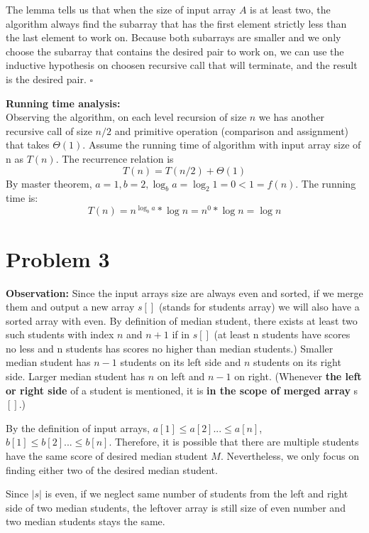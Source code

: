 \documentclass{article}
\begin{document}
The lemma tells us that when the size of input array $A$ is at least two, the algorithm always find the subarray that has the first element strictly less than the last element to work on. Because both subarrays are smaller and we only choose the subarray that contains the desired pair to work on, we can use the inductive hypothesis on choosen recursive call that will terminate, and the result is the desired pair. $\square$

\textbf{Running time analysis:}\\
Observing the algorithm, on each level recursion of size $n$ we has another recursive call of size $n/2$ and primitive operation (comparison and assignment) that takes $\Theta(1)$. Assume the running time of algorithm with input array size of n as $T(n)$. The recurrence relation is \[T(n)=T(n/2)+\Theta(1)\]
By master theorem, $a = 1, b = 2, \log_b{a} = \log_2{1} = 0 < 1 = f(n)$. The running time is: \[T(n) = n^{\log_b{a}}*\log{n} = n^0*\log{n} = \log{n}\]

\section{Problem 3}

\textbf{Observation:} Since the input arrays size are always even and sorted, if we merge them and output a new array $s[]$ (stands for students array) we will also have a sorted array with even. By definition of median student, there exists at least two such students with index $n$ and $n+1$ if in $s[]$ (at least n students have scores no less and n students has scores no higher than median students.) Smaller median student has $n-1$ students on its left side and $n$ students on its right side. Larger median student has $n$ on left and $n-1$ on right. (Whenever \textbf{the left or right side} of a student is mentioned, it is \textbf{in the scope of merged array} s$[]$.)

By the definition of input arrays, $a[1]\leq a[2] ... \leq a[n]$,  $b[1]\leq b[2] ... \leq b[n]$. Therefore, it is possible that there are multiple students have the same score of desired median student $M$. Nevertheless, we only focus on finding either two of the desired median student.

Since $|s|$ is even, if we neglect same number of students from the left and right side of two median students, the leftover array is still size of even number and two median students stays the same.
\end{document}
